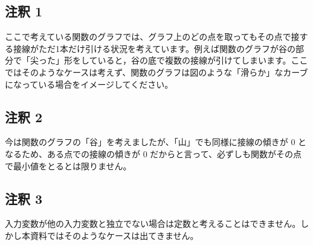 \subsection{注釈 1}
\label{04-basics-of-differential-note1}


ここで考えている関数のグラフでは、グラフ上のどの点を取ってもその点で接する接線がただ1本だけ引ける状況を考えています。例えば関数のグラフが谷の部分で「尖った」形をしていると，谷の底で複数の接線が引けてしまいます。ここではそのようなケースは考えず、関数のグラフは図のような「滑らか」なカーブになっている場合をイメージしてください。


\subsection{注釈 2}
\label{04-basics-of-differential-note2}


今は関数のグラフの「谷」を考えましたが、「山」でも同様に接線の傾きが $0$ となるため、ある点での接線の傾きが $0$ だからと言って、必ずしも関数がその点で最小値をとるとは限りません。


\subsection{注釈 3}
\label{04-basics-of-differential-note3}


入力変数が他の入力変数と独立でない場合は定数と考えることはできません。しかし本資料ではそのようなケースは出てきません。
